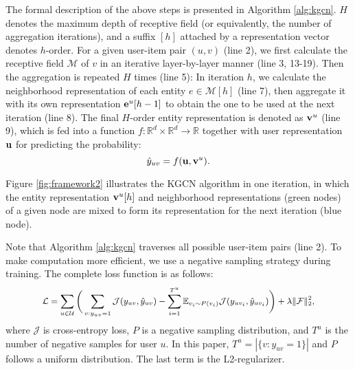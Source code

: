 \documentclass[sigconf]{acmart}
\begin{document}
		The formal description of the above steps is presented in Algorithm \ref{alg:kgcn}.
		$H$ denotes the maximum depth of receptive field (or equivalently, the number of aggregation iterations), and a suffix $[h]$ attached by a representation vector denotes $h$-order.
		For a given user-item pair $(u, v)$ (line 2), we first calculate the receptive field $\mathcal M$ of $v$ in an iterative layer-by-layer manner (line 3, 13-19).
		Then the aggregation is repeated $H$ times (line 5):
		In iteration $h$, we calculate the neighborhood representation of each entity $e \in \mathcal M[h]$ (line 7), then aggregate it with its own representation ${\bf e}^u[h-1]$ to obtain the one to be used at the next iteration (line 8).
		The final $H$-order entity representation is denoted as ${\bf v}^u$ (line 9), which is fed into a function $f: \mathbb R^d \times \mathbb R^d \rightarrow \mathbb R$ together with user representation $\bf u$ for predicting the probability:
		\begin{equation}
			\hat y_{uv} = f({\bf u}, {\bf v}^u).
		\end{equation}
		
		Figure \ref{fig:framework2} illustrates the KGCN algorithm in one iteration, in which the entity representation ${\bf v}^u[h]$ and neighborhood representations (green nodes) of a given node are mixed to form its representation for the next iteration (blue node).
		
		Note that Algorithm \ref{alg:kgcn} traverses all possible user-item pairs (line 2).
		To make computation more efficient, we use a negative sampling strategy during training.
		The complete loss function is as follows:
		\begin{equation}
		\label{eq:loss}
		\small
		\begin{split}
			\mathcal L = \sum_{u \in \mathcal U} \bigg(\sum_{v: y_{uv}=1} \mathcal J(y_{uv}, \hat y_{uv}) - \sum_{i=1}^{T^u} \mathbb E_{v_i \sim P(v_i)} \mathcal J(y_{uv_i}, \hat y_{uv_i}) \bigg) + \lambda \| \mathcal F \|^2_2,
		\end{split}
		\end{equation}
		where $\mathcal J$ is cross-entropy loss, $P$ is a negative sampling distribution, and $T^u$ is the number of negative samples for user $u$.
		In this paper, $T^u = |\{ v:y_{uv}=1 \}|$ and $P$ follows a uniform distribution.
		The last term is the L2-regularizer.

	\iffalse
\end{document}
